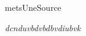 
metsUneSource


\lipsum[1-2]

\begin{metsUneSource}
\lipsum[3]
\end{metsUneSource}

\textit{dcnduvbdvbdbvdiubvk}